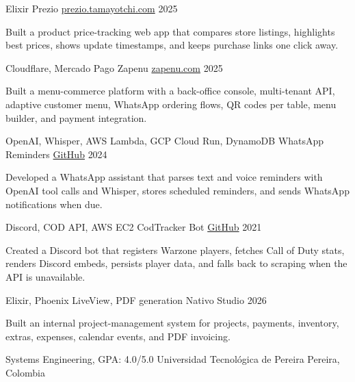 \documentclass[]{awesome-cv}
\begin{document}
\begin{cventries}
  \cventry
  {Elixir}
  {Prezio}
  {\href{https://prezio.tamayotchi.com/}{prezio.tamayotchi.com}}
  {2025}
  {\begin{cvitems}
    \item {Built a product price-tracking web app that compares store listings, highlights best prices, shows update timestamps, and keeps purchase links one click away.}
  \end{cvitems}}

  \cventry
  {Cloudflare, Mercado Pago}
  {Zapenu}
  {\href{https://zapenu.com/lepancake/gKhixyg}{zapenu.com}}
  {2025}
  {\begin{cvitems}
    \item {Built a menu-commerce platform with a back-office console, multi-tenant API, adaptive customer menu, WhatsApp ordering flows, QR codes per table, menu builder, and payment integration.}
  \end{cvitems}}

  \cventry
  {OpenAI, Whisper, AWS Lambda, GCP Cloud Run, DynamoDB}
  {WhatsApp Reminders}
  {\href{https://github.com/tamayotchi/WhatsAppReminders}{GitHub}}
  {2024}
  {\begin{cvitems}
    \item {Developed a WhatsApp assistant that parses text and voice reminders with OpenAI tool calls and Whisper, stores scheduled reminders, and sends WhatsApp notifications when due.}
  \end{cvitems}}

  \cventry
  {Discord, COD API, AWS EC2}
  {CodTracker Bot}
  {\href{https://github.com/tamayotchi/CodTracker-Bot}{GitHub}}
  {2021}
  {\begin{cvitems}
    \item {Created a Discord bot that registers Warzone players, fetches Call of Duty stats, renders Discord embeds, persists player data, and falls back to scraping when the API is unavailable.}
  \end{cvitems}}

  \cventry
  {Elixir, Phoenix LiveView, PDF generation}
  {Nativo Studio}
  {}
  {2026}
  {\begin{cvitems}
    \item {Built an internal project-management system for projects, payments, inventory, extras, expenses, calendar events, and PDF invoicing.}
  \end{cvitems}}
\end{cventries}
\vspace{-3mm}

\begin{cventries}
  \cventry
  {Systems Engineering, GPA: 4.0/5.0}
  {Universidad Tecnológica de Pereira}
  {Pereira, Colombia}
  {}
  {}
\end{cventries}
\end{document}
